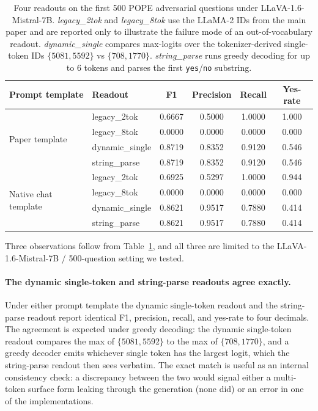 \documentclass{article}
\begin{document}
\begin{table}[h]
\caption{Four readouts on the first 500 POPE adversarial questions
under LLaVA-1.6-Mistral-7B. \emph{legacy\_2tok} and \emph{legacy\_8tok}
use the LLaMA-2 IDs from the main paper and are reported only to
illustrate the failure mode of an out-of-vocabulary readout.
\emph{dynamic\_single} compares max-logits over the tokenizer-derived
single-token IDs $\{5081, 5592\}$ vs $\{708, 1770\}$.
\emph{string\_parse} runs greedy decoding for up to 6 tokens and
parses the first \texttt{yes}/\texttt{no} substring.}
\label{tab:crossmodel-eval}
\centering
\small
\begin{tabular}{llcccc}
\toprule
Prompt template & Readout & F1 & Precision & Recall & Yes-rate \\
\midrule
\multirow{4}{*}{Paper template}
 & legacy\_2tok       & 0.6667 & 0.5000 & 1.0000 & 1.000 \\
 & legacy\_8tok       & 0.0000 & 0.0000 & 0.0000 & 0.000 \\
 & dynamic\_single    & 0.8719 & 0.8352 & 0.9120 & 0.546 \\
 & string\_parse      & 0.8719 & 0.8352 & 0.9120 & 0.546 \\
\midrule
\multirow{4}{*}{Native chat template}
 & legacy\_2tok       & 0.6925 & 0.5297 & 1.0000 & 0.944 \\
 & legacy\_8tok       & 0.0000 & 0.0000 & 0.0000 & 0.000 \\
 & dynamic\_single    & 0.8621 & 0.9517 & 0.7880 & 0.414 \\
 & string\_parse      & 0.8621 & 0.9517 & 0.7880 & 0.414 \\
\bottomrule
\end{tabular}
\end{table}

Three observations follow from Table~\ref{tab:crossmodel-eval}, and
all three are limited to the LLaVA-1.6-Mistral-7B / 500-question
setting we tested.

\paragraph{The dynamic single-token and string-parse readouts agree
exactly.} Under either prompt template the dynamic single-token
readout and the string-parse readout report identical F1, precision,
recall, and yes-rate to four decimals. The agreement is expected
under greedy decoding: the dynamic single-token readout compares the
max of $\{5081, 5592\}$ to the max of $\{708, 1770\}$, and a greedy
decoder emits whichever single token has the largest logit, which the
string-parse readout then sees verbatim. The exact match is useful as
an internal consistency check: a discrepancy between the two would
signal either a multi-token surface form leaking through the
generation (none did) or an error in one of the implementations.
\end{document}
